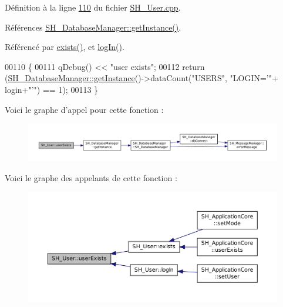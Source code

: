 Définition à la ligne \hyperlink{SH__User_8cpp_source_l00110}{110} du fichier \hyperlink{SH__User_8cpp_source}{S\-H\-\_\-\-User.\-cpp}.



Références \hyperlink{classSH__DatabaseManager_a31198eb4de0f8b18e3fa0eed09f24d19}{S\-H\-\_\-\-Database\-Manager\-::get\-Instance()}.



Référencé par \hyperlink{classSH__User_aeefcf386df717163d07e17c48205814b}{exists()}, et \hyperlink{classSH__User_a98e3e3ca706a6988e6d7af23ce8bb82a}{log\-In()}.


\begin{DoxyCode}
00110                                       \{
00111     qDebug() << \textcolor{stringliteral}{"user exists"};
00112     \textcolor{keywordflow}{return} (\hyperlink{classSH__DatabaseManager_a31198eb4de0f8b18e3fa0eed09f24d19}{SH\_DatabaseManager::getInstance}()->dataCount(\textcolor{stringliteral}{"USERS"}, \textcolor{stringliteral}{"LOGIN='"}+
      login+\textcolor{stringliteral}{"'"}) == 1);
00113 \}
\end{DoxyCode}


Voici le graphe d'appel pour cette fonction \-:\nopagebreak
\begin{figure}[H]
\begin{center}
\leavevmode
\includegraphics[width=350pt]{classSH__User_a64161b35866b1c635d5f4214095a2b1e_cgraph}
\end{center}
\end{figure}




Voici le graphe des appelants de cette fonction \-:\nopagebreak
\begin{figure}[H]
\begin{center}
\leavevmode
\includegraphics[width=350pt]{classSH__User_a64161b35866b1c635d5f4214095a2b1e_icgraph}
\end{center}
\end{figure}


